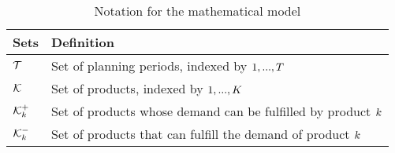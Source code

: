 \documentclass[msom]{oo}
\begin{document}





\begin{table}[ht]
\centering
\caption{Notation for the mathematical model}
\begin{adjustbox}{width=1\textwidth,center=\textwidth}
\begin{tabular}{ll}
\toprule
{\textbf {Sets}} & {\textbf {Definition}} \\ \midrule
$\mathcal{T}$  & Set of planning periods, indexed by $1, ... ,T$ \\ 
$\mathcal{K}$  & Set of products, indexed by $1, ... ,K$ \\
$  \mathcal{K}^+_k$ %
& Set of products whose demand can be fulfilled by product $k$  \\
$ \mathcal{K}^-_k$ %
& Set of products that can fulfill the demand of product $k$  \\

\end{tabular}
\end{adjustbox}
\end{table}
\end{document}
